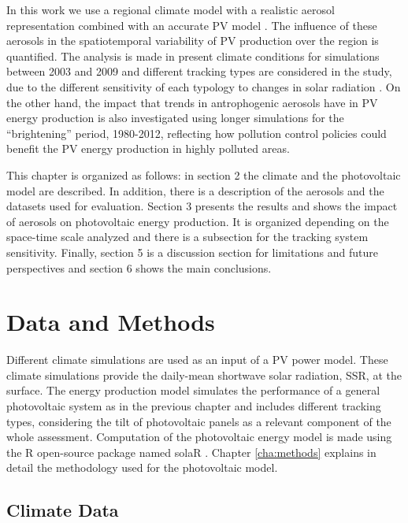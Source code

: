 In this work we use a regional climate model \cite*{Nabat2015} with a realistic aerosol representation combined with an accurate PV model \cite*{Perpinan2012}. The influence of these aerosols in the spatiotemporal variability of PV production over the region is quantified. The analysis is made in present climate conditions for simulations between 2003 and 2009 and different tracking types are considered in the study, due to the different sensitivity of each typology to changes in solar radiation \cite*{Gutierrez2017}. On the other hand, the impact that trends in antrophogenic aerosols have in PV energy production is also investigated using longer simulations for the ``brightening'' \cite*{Wild2005} period, 1980-2012, reflecting how pollution control policies could benefit the PV energy production in highly polluted areas.

This chapter is organized as follows: in section 2 the climate and the photovoltaic model are described. In addition, there is a description of the aerosols and the datasets used for evaluation. Section 3 presents the results and shows the impact of aerosols on photovoltaic energy production. It is organized depending on the space-time scale analyzed and there is a subsection for the tracking system sensitivity.  Finally, section 5 is a discussion section for limitations and future perspectives and section 6 shows the main conclusions.

\section{Data and Methods}

Different climate simulations are used as an input of a PV power model. These climate simulations provide the daily-mean shortwave solar radiation, SSR, at the surface. The energy production model simulates the performance of a general photovoltaic system as in the previous chapter and includes different tracking types, considering the tilt of photovoltaic panels as a relevant component of the whole assessment. Computation of the photovoltaic energy model is made using the R open-source package named solaR \cite*{Perpinan2012}. Chapter \ref{cha:methods} explains in detail the methodology used for the photovoltaic model. 

\subsection{Climate Data}


